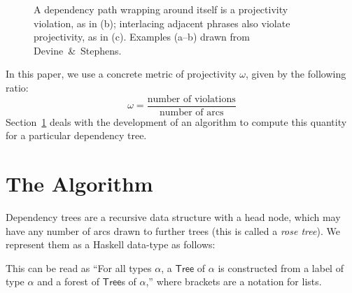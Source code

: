 \documentclass{article}
\def\resethooks{%
  \global\let\SaveRestoreHook\empty
  \global\let\ColumnHook\empty}
\let\hspre\empty
\let\hspost\empty
\begin{document}
\begin{figure}[h!]
\centering
{}
\hspace{6pt}

\caption{A dependency path wrapping around itself is a projectivity violation,
as in (b); interlacing adjacent phrases also violate projectivity, as in
(c). Examples (a--b) drawn from Devine~\&~Stephens.}
\label{fig:dependency-trees}
\end{figure}

\noindent
In this paper, we use a concrete metric of projectivity $\omega$, given by the following
ratio:
\[
    \omega = \frac{\text{number of violations}}{\text{number of arcs}}
\]
Section~\ref{sec:algorithm} deals with the development of an algorithm to
compute this quantity for a particular dependency tree.

\section{The Algorithm}
\label{sec:algorithm}

Dependency trees are a recursive data structure
with a head node, which may have any number of arcs drawn to further trees (this
is called a \emph{rose tree}). We represent them as a Haskell data-type as
follows:
\begin{hscode}\SaveRestoreHook
\column{B}{@{}>{\hspre}l<{\hspost}@{}}%
\column{3}{@{}>{\hspre}l<{\hspost}@{}}%
\column{E}{@{}>{\hspre}l<{\hspost}@{}}%
\>[3]{}\;\;\alpha\mathrel{=}\alpha{}\<[E]%
\ColumnHook
\end{hscode}\resethooks
This can be read as ``For all types \ensuremath{\alpha}, a \ensuremath{\mathsf{Tree}} of \ensuremath{\alpha} is constructed from a
label of type \ensuremath{\alpha} and a forest of \ensuremath{\mathsf{Tree}}s of \ensuremath{\alpha},'' where brackets are a notation
for lists.
\end{document}
